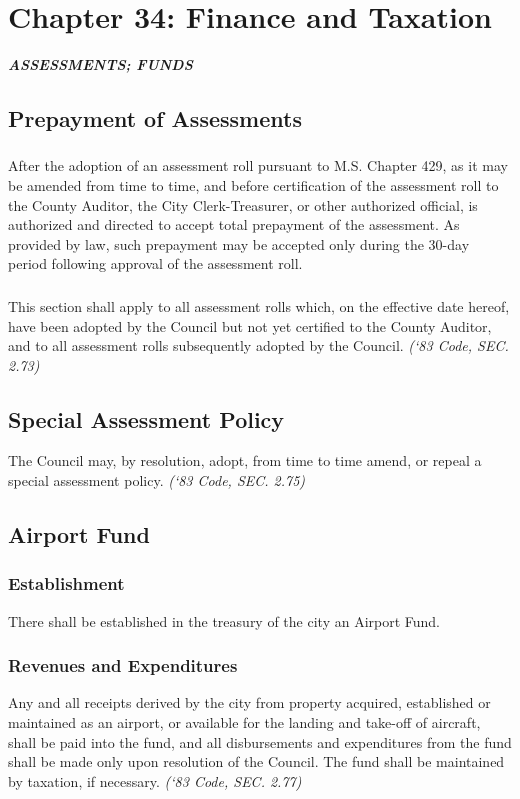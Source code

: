 %
\chapter*{Chapter 34: \newline
	Finance and Taxation}

\centerline{\textbf{\emph{\LARGE{ASSESSMENTS; FUNDS}}}}
\section{Prepayment of Assessments}
\subsection{}
After the adoption of an assessment roll pursuant to M.S. Chapter 429, as it may be amended from time to time, and before certification of the assessment roll to the County Auditor, the City Clerk-Treasurer, or other authorized official, is authorized and directed to accept total prepayment of the assessment.  As provided by law, such prepayment may be accepted only during the 30-day period following approval of the assessment roll.
\subsection{}
This section shall apply to all assessment rolls which, on the effective date hereof, have been adopted by the Council but not yet certified to the County Auditor, and to all assessment rolls subsequently adopted by the Council.\newline
\emph{(‘83 Code, SEC. 2.73)}
\section{Special Assessment Policy}
The Council may, by resolution, adopt, from time to time amend, or repeal a special assessment policy.\newline
\emph{(‘83 Code, SEC. 2.75)}
\section{Airport Fund}
\subsection{Establishment}
There shall be established in the treasury of the city an Airport Fund.
\subsection{Revenues and Expenditures}
Any and all receipts derived by the city from property acquired, established or maintained as an airport, or available for the landing and take-off of aircraft, shall be paid into the fund, and all disbursements and expenditures from the fund shall be made only upon resolution of the Council.  The fund shall be maintained by taxation, if necessary.\newline
\emph{(‘83 Code, SEC. 2.77)}

